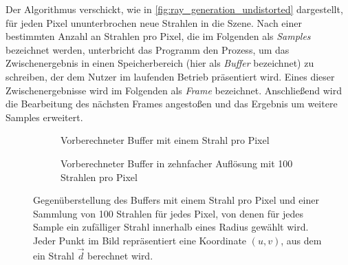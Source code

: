 \documentclass[thesis.tex]{subfiles}
\begin{document}
Der Algorithmus verschickt, wie in \autoref{fig:ray_generation_undistorted} dargestellt, für jeden Pixel ununterbrochen neue Strahlen in die Szene. Nach einer bestimmten Anzahl an Strahlen pro Pixel, die im Folgenden als \emph{Samples} bezeichnet werden, unterbricht das Programm den Prozess, um das Zwischenergebnis in einen Speicherbereich (hier als \emph{Buffer} bezeichnet) zu schreiben, der dem Nutzer im laufenden Betrieb präsentiert wird. Eines dieser Zwischenergebnisse wird im Folgenden als \emph{Frame} bezeichnet. Anschließend wird die Bearbeitung des nächsten Frames angestoßen und das Ergebnis um weitere Samples erweitert. 

\begin{figure}[h]
\centering
\begin{subfigure}[b]{0.49\textwidth}
\centering
{}
\caption{Vorberechneter Buffer mit einem Strahl pro Pixel}
\label{fig:ray_generation_grid_1}
\end{subfigure}
\begin{subfigure}[b]{0.49\textwidth}
\centering
{}
\caption{Vorberechneter Buffer in zehnfacher Auflösung mit 100 Strahlen pro Pixel}
\label{fig:ray_generation_grid_2}
\end{subfigure}
\caption{Gegenüberstellung des Buffers mit einem Strahl pro Pixel und einer Sammlung von 100 Strahlen für jedes Pixel, von denen für jedes Sample ein zufälliger Strahl innerhalb eines Radius gewählt wird. Jeder Punkt im Bild repräsentiert eine Koordinate $(u, v)$, aus dem ein Strahl $\vec d$ berechnet wird.}
\end{figure}\label{fig:precalculated_rays}
\end{document}

